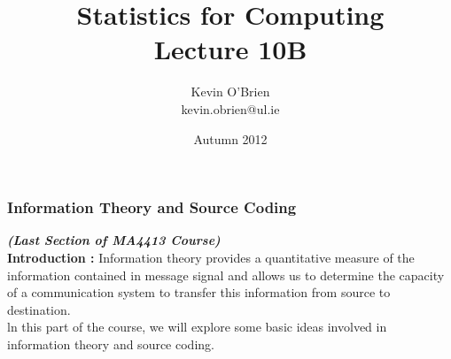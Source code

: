 \documentclass[a4]{beamer}
\title[MA4413]{Statistics for Computing \\ {\normalsize Lecture 10B}}
\author[Kevin O'Brien]{Kevin O'Brien \\ {\scriptsize kevin.obrien@ul.ie}}
\date{Autumn 2012}
\institute[Maths \& Stats]{Dept. of Mathematics \& Statistics, \\ University \textit{of} Limerick}
\begin{document}


\begin{frame}
\titlepage
\end{frame}
\begin{frame}
\frametitle{Information Theory and Source Coding}
\textbf{\textit{(Last Section of MA4413 Course)}}\\
\bigskip
\textbf{Introduction : } Information theory provides a quantitative measure of the information contained in message signal and allows us to determine the capacity of a communication system to transfer this information from source to destination. \\ \bigskip ln this part of the course, we will explore some basic ideas involved in information theory and source coding.
\end{frame}
\end{document}
